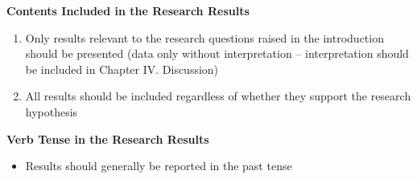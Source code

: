\textbf{Contents Included in the Research Results}
\begin{enumerate}
    \item Only results relevant to the research questions raised in the introduction should be presented (data only without interpretation -- interpretation should be included in Chapter IV. Discussion)
    \item All results should be included regardless of whether they support the research hypothesis
\end{enumerate}

\textbf{Verb Tense in the Research Results}
\begin{itemize}
    \item Results should generally be reported in the past tense
\end{itemize}